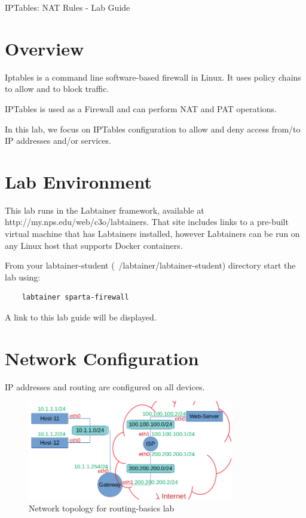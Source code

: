 


\begin{center}
{\LARGE IPTables: NAT Rules - Lab Guide}
\vspace{0.1in}\\
\end{center}

\copyrightnotice

\section{Overview}
Iptables is a command line software-based firewall in Linux. It uses policy chains to allow and to block traffic.

IPTables is used as a Firewall and can perform NAT and PAT operations.

In this lab, we focus on IPTables configuration to allow and deny access from/to IP addresses and/or services.

\section{Lab Environment}
This lab runs in the Labtainer framework,
available at http://my.nps.edu/web/c3o/labtainers.
That site includes links to a pre-built virtual machine
that has Labtainers installed, however Labtainers can
be run on any Linux host that supports Docker containers.

From your labtainer-student (~/labtainer/labtainer-student) directory start the lab using:
\begin{verbatim}
    labtainer sparta-firewall
\end{verbatim}
\noindent A link to this lab guide will be displayed.

\section{Network Configuration}
IP addresses and routing are configured on all devices.

\begin{figure}[H]
\begin{center}
\includegraphics [width=0.8\textwidth]{labtainers-nat-lab-01.png}
\end{center}
\caption{Network topology for routing-basics lab}
\label{fig:topology}
\end{figure}

